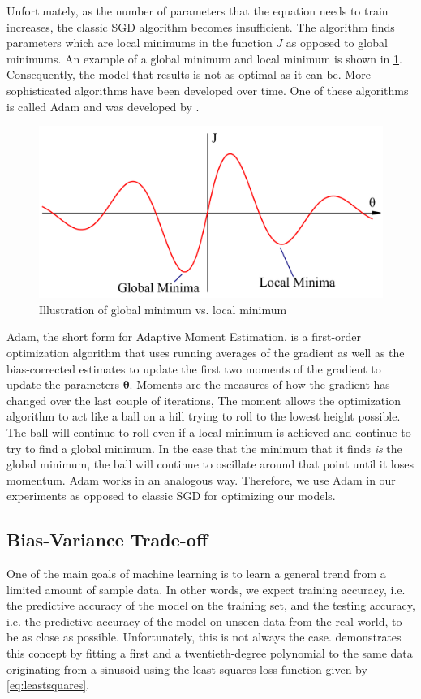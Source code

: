 Unfortunately, as the number of parameters that the equation needs to train increases, the classic SGD algorithm becomes insufficient. The algorithm finds parameters which are local minimums in the function $J$ as opposed to global minimums. An example of a global minimum and local minimum is shown in \cref{fig:minmax}. Consequently, the model that results is not as optimal as it can be. More sophisticated algorithms have been developed over time. One of these algorithms is called Adam and was developed by \citet{kingma2014adam}. 

\begin{figure}[!ht]
	\centering
	\includegraphics[width=0.6\linewidth]{pictures/minmax.pdf}
	\caption{Illustration of global minimum vs. local minimum}\label{fig:minmax}  
\end{figure}

Adam, the short form for Adaptive Moment Estimation, is a first-order optimization algorithm that uses running averages of the gradient as well as the  bias-corrected estimates to update the first two moments of the gradient to update the parameters $\boldsymbol{\theta}$. Moments are the measures of how the gradient has changed over the last couple of iterations,  The moment allows the optimization algorithm to act like a ball on a hill trying to roll to the lowest height possible. The ball will continue to roll even if a local minimum is achieved and continue to try to find a global minimum. In the case that the minimum that it finds \textit{is} the global minimum, the ball will continue to oscillate around that point until it loses momentum. Adam works in an analogous way. Therefore, we use Adam in our experiments as opposed to classic SGD for optimizing our models. 

\subsection{Bias-Variance Trade-off}
\label{bias_variance_tradeoff}

One of the main goals of machine learning is to learn a general trend from a limited amount of sample data. In other words, we expect training accuracy, i.e. the predictive accuracy of the model on the training set, and the testing accuracy, i.e. the predictive accuracy of the model on unseen data from the real world, to be as close as possible. Unfortunately, this is not always the case.  demonstrates this concept by fitting a first and a twentieth-degree polynomial to the same data originating from a sinusoid using the least squares loss function given by \cref{eq:leastsquares}. 

